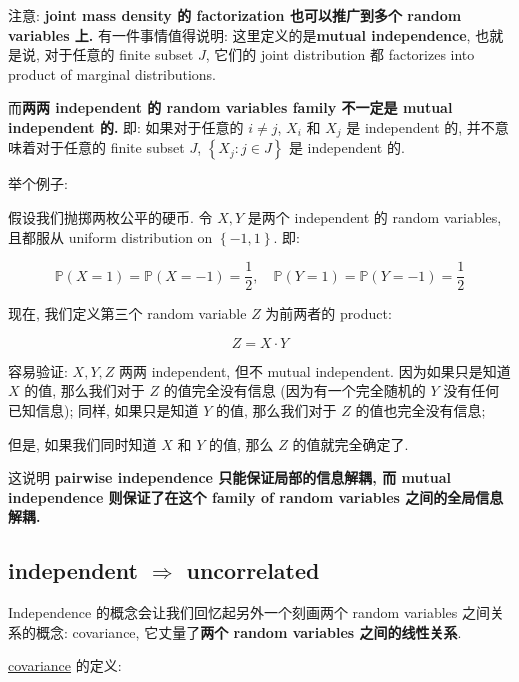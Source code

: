 \documentclass{qlnotes-export}
\begin{document}
注意: \textbf{joint mass{ } density 的 factorization 也可以推广到多个 random variables 上.} 有一件事情值得说明: 这里定义的是\textbf{mutual independence}, 也就是说, 对于任意的 finite subset \(J\), 它们的 joint distribution 都 factorizes into product of marginal distributions.

而\textbf{两两 independent 的 random variables family 不一定是 mutual independent 的.} 即: 如果对于任意的 \(i \neq j\), \(X_{i}\) 和 \(X_{j}\) 是 independent 的, 并不意味着对于任意的 finite subset \(J\), \(\left\{ {X_{j}:j \in J} \right\}\) 是 independent 的.

举个例子:

\begin{example}

假设我们抛掷两枚公平的硬币. 令 \(X,Y\) 是两个 independent 的 random variables, 且都服从 uniform distribution on \(\left\{ {- 1,1} \right\}\). 即:

\[{\mathbb{P}}(X = 1) = {\mathbb{P}}(X = - 1) = \frac{1}{2},\quad{\mathbb{P}}(Y = 1) = {\mathbb{P}}(Y = - 1) = \frac{1}{2}\]

现在, 我们定义第三个 random variable \(Z\) 为前两者的 product:

\[Z = X \cdot Y\]

容易验证: \(X,Y,Z\) 两两 independent, 但不 mutual independent. 因为如果只是知道 \(X\) 的值, 那么我们对于 \(Z\) 的值完全没有信息 (因为有一个完全随机的 \(Y\) 没有任何已知信息); 同样, 如果只是知道 \(Y\) 的值, 那么我们对于 \(Z\) 的值也完全没有信息;

但是, 如果我们同时知道 \(X\) 和 \(Y\) 的值, 那么 \(Z\) 的值就完全确定了.

这说明 \textbf{pairwise independence 只能保证局部的信息解耦, 而 mutual independence 则保证了在这个 family of random variables 之间的全局信息解耦.}

\end{example}

\subsection{\texorpdfstring{independent \(\Longrightarrow\) uncorrelated}{independent \textbackslash Longrightarrow uncorrelated}}\label{independent-longrightarrow-uncorrelated}

Independence 的概念会让我们回忆起另外一个刻画两个 random variables 之间关系的概念: covariance, 它丈量了\textbf{两个 random variables 之间的线性关系}.

\href{https://qiulinfan.github.io/notes/math/probability/\#kn-covariance}{covariance} 的定义:
\end{document}
